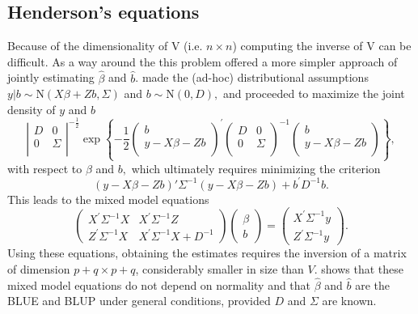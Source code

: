 \documentclass[12pt, a4paper]{report}
\theoremstyle{plain}
\theoremstyle{definition}
\theoremstyle{remark}
\begin{document}
	\subsection{Henderson's equations}
	Because of the dimensionality of V (i.e. $n \times n$) computing the inverse of V can be difficult. As a way around the this problem \citet{Henderson53, Henderson59,Henderson63,Henderson73,Henderson84a} offered a more simpler approach of jointly estimating $\hat{\beta}$ and $\hat{b}$.
	\cite{Henderson:1950} made the (ad-hoc) distributional assumptions $y|b \sim \mathrm{N} (X \beta + Zb, \Sigma)$ and $b \sim \mathrm{N}(0,D),$ and proceeded to maximize the joint density of $y$ and $b$
	\begin{equation}
	\left|
	\begin{array}{cc}
	D & 0 \\
	0 & \Sigma \\
	\end{array}
	\right|^{-\frac{1}{2}}
	\exp
	\left\{ -\frac{1}{2}
	\left(
	\begin{array}{c}
	b \\
	y - X \beta -Zb \\
	\end{array}
	\right)^\prime
	\left( \begin{array}{cc}
	D & 0 \\
	0 & \Sigma \\
	\end{array}\right)^{-1}
	\left(
	\begin{array}{c}
	b \\
	y - X \beta -Zb \\
	\end{array}
	\right)
	\right\},
	\label{u&beta:JointDensity}
	\end{equation}
	with respect to $\beta$ and $b,$ which ultimately requires minimizing the criterion
	\begin{equation}
	(y - X \beta -Zb)'\Sigma^{-1}(y - X \beta -Zb) + b^\prime D^{-1}b.
	\label{Henderson:Criterion}
	\end{equation}
	This leads to the mixed model equations
	\begin{equation}
	\left(\begin{array}{cc}
	X^\prime\Sigma^{-1}X & X^\prime\Sigma^{-1}Z
	\\
	Z^\prime\Sigma^{-1}X & X^\prime\Sigma^{-1}X + D^{-1}
	\end{array}\right)
	\left(\begin{array}{c}
	\beta \\
	b
	\end{array}\right)
	=
	\left(\begin{array}{c}
	X^\prime\Sigma^{-1}y \\
	Z^\prime\Sigma^{-1}y
	\end{array}\right).
	\label{Henderson:Equations}
	\end{equation}
	Using these equations, obtaining the estimates requires the inversion of a matrix
	of dimension $p+q \times p+q$, considerably smaller in size than $V$. \citet{Henderson1963} shows that these mixed model equations do not depend on normality and that $\hat{\beta}$ and $\hat{b}$ are the BLUE and BLUP under general conditions, provided $D$ and $\Sigma$ are known.
	
\end{document}
